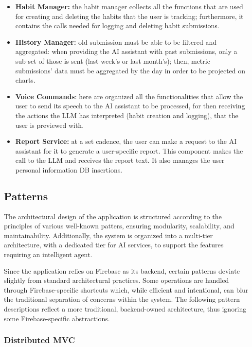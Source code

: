 \documentclass{article}
\begin{document}
\begin{itemize}
	\item \textbf{Habit Manager:} the habit manager collects all the functions that are used for creating and deleting the habits that the user is tracking; furthermore, it contains the calls needed for logging and deleting habit submissions.
	\item \textbf{History Manager:} old submission must be able to be filtered and aggregated: when providing the AI assistant with past submissions, only a sub-set of those is sent (last week's or last month's); then, metric submissions' data must be aggregated by the day in order to be projected on charts.
	\item \textbf{Voice Commands}: here are organized all the functionalities that allow the user to send its speech to the AI assistant to be processed, for then receiving the actions the LLM has interpreted (habit creation and logging), that the user is previewed with.
	\item \textbf{Report Service:} at a set cadence, the user can make a request to the AI assistant for it to generate a user-specific report. This component makes the call to the LLM and receives the report text. It also manages the user personal information DB insertions.
\end{itemize}

\subsection{Patterns}

The architectural design of the application is structured according to the principles of various well-known patters, ensuring modularity, scalability, and maintainability.
Additionally, the system is organized into a multi-tier architecture, with a dedicated tier for AI services, to support the features requiring an intelligent agent.

Since the application relies on Firebase as its backend, certain patterns deviate slightly from standard architectural practices.
Some operations are handled through Firebase-specific shortcuts which, while efficient and intentional, can blur the traditional separation of concerns within the system.
The following pattern descriptions reflect a more traditional, backend-owned architecture, thus ignoring some Firebase-specific abstractions.

\subsubsection{Distributed MVC}
\end{document}
